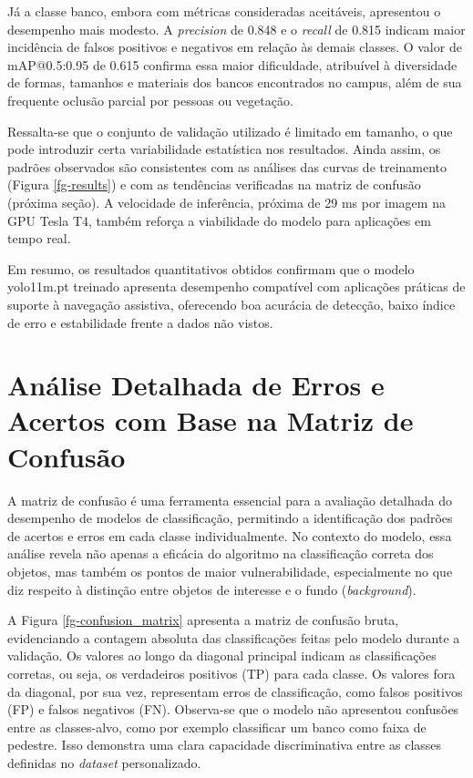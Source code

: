 Já a classe banco, embora com métricas consideradas aceitáveis, apresentou o desempenho mais modesto. A \textit{precision} de 0.848 e o \textit{recall} de 0.815 indicam maior incidência de falsos positivos e negativos em relação às demais classes. O valor de mAP@0.5:0.95 de 0.615 confirma essa maior dificuldade, atribuível à diversidade de formas, tamanhos e materiais dos bancos encontrados no campus, além de sua frequente oclusão parcial por pessoas ou vegetação.

Ressalta-se que o conjunto de validação utilizado é limitado em tamanho, o que pode introduzir certa variabilidade estatística nos resultados. Ainda assim, os padrões observados são consistentes com as análises das curvas de treinamento (Figura \ref{fg-results}) e com as tendências verificadas na matriz de confusão (próxima seção). A velocidade de inferência, próxima de 29 ms por imagem na GPU Tesla T4, também reforça a viabilidade do modelo para aplicações em tempo real.

Em resumo, os resultados quantitativos obtidos confirmam que o modelo yolo11m.pt treinado apresenta desempenho compatível com aplicações práticas de suporte à navegação assistiva, oferecendo boa acurácia de detecção, baixo índice de erro e estabilidade frente a dados não vistos.

\section{\textbf{Análise Detalhada de Erros e Acertos com Base na Matriz de Confusão}}

A matriz de confusão é uma ferramenta essencial para a avaliação detalhada do desempenho de modelos de classificação, permitindo a identificação dos padrões de acertos e erros em cada classe individualmente. No contexto do modelo, essa análise revela não apenas a eficácia do algoritmo na classificação correta dos objetos, mas também os pontos de maior vulnerabilidade, especialmente no que diz respeito à distinção entre objetos de interesse e o fundo (\textit{background}).

A Figura \ref{fg-confusion_matrix} apresenta a matriz de confusão bruta, evidenciando a contagem absoluta das classificações feitas pelo modelo durante a validação. Os valores ao longo da diagonal principal indicam as classificações corretas, ou seja, os verdadeiros positivos (TP) para cada classe. Os valores fora da diagonal, por sua vez, representam erros de classificação, como falsos positivos (FP) e falsos negativos (FN). Observa-se que o modelo não apresentou confusões entre as classes-alvo, como por exemplo classificar um banco como faixa de pedestre. Isso demonstra uma clara capacidade discriminativa entre as classes definidas no \textit{dataset} personalizado.


